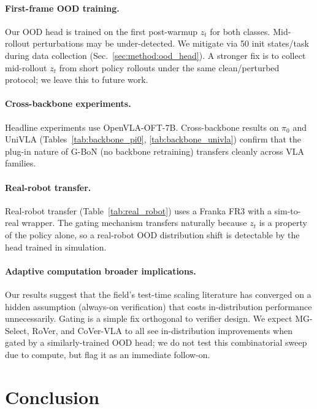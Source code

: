\documentclass{article}
\begin{document}
\paragraph{First-frame OOD training.}
Our OOD head is trained on the first post-warmup $z_t$ for both
classes. Mid-rollout perturbations may be under-detected. We
mitigate via 50 init states/task during data collection
(Sec.~\ref{sec:method:ood_head}). A stronger fix is to collect
mid-rollout $z_t$ from short policy rollouts under the same
clean/perturbed protocol; we leave this to future work.

\paragraph{Cross-backbone experiments.}
Headline experiments use OpenVLA-OFT-7B.
Cross-backbone results on $\pi_0$ and UniVLA
(Tables~\ref{tab:backbone_pi0}, \ref{tab:backbone_univla}) confirm
that the plug-in nature of G-BoN (no backbone retraining) transfers
cleanly across VLA families.

\paragraph{Real-robot transfer.}
Real-robot transfer (Table~\ref{tab:real_robot}) uses a Franka FR3 with
a sim-to-real wrapper.
The gating mechanism transfers naturally because $z_t$ is a
property of the policy alone, so a real-robot OOD distribution shift
is detectable by the head trained in simulation.

\paragraph{Adaptive computation broader implications.}
Our results suggest that the field's test-time scaling literature
has converged on a hidden assumption (always-on verification) that
costs in-distribution performance unnecessarily. Gating is a simple
fix orthogonal to verifier design. We expect MG-Select, RoVer,
and CoVer-VLA to all see in-distribution improvements when gated
by a similarly-trained OOD head; we do not test this combinatorial
sweep due to compute, but flag it as an immediate follow-on.

\section{Conclusion}
\label{sec:conclusion}
\end{document}
